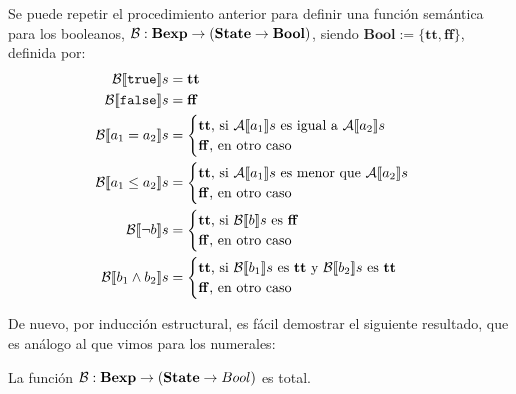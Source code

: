 Se puede repetir el procedimiento anterior para definir una función semántica para los booleanos, $\mathcal{B} : \mathbf{Bexp} \rightarrow (\mathbf{State}\rightarrow \mathbf{Bool})$, siendo $\mathbf{Bool} := \{\mathbf{tt}, \mathbf{ff}\}$, definida por:
\begin{align*}
    \fc{B}{\n{true}}s & = \mathbf{tt}\\
    \fc{B}{\n{false}}s & = \mathbf{ff} \\
    \fc{B}{a_1 = a_2}s & = \begin{cases} \mathbf{tt}\text{, si }\fc{A}{a_1}s\text{ es igual a } \fc{A}{a_2}s \\ \mathbf{ff}\text{, en otro caso}\end{cases}\\
    \fc{B}{a_1 \leq a_2}s & = \begin{cases} \mathbf{tt}\text{, si }\fc{A}{a_1}s\text{ es menor que } \fc{A}{a_2}s \\ \mathbf{ff}\text{, en otro caso}\end{cases}\\
    \fc{B}{\neg b}s & = \begin{cases} \mathbf{tt}\text{, si }\fc{B}{b}s\text{ es } \mathbf{ff} \\ \mathbf{ff} \text{, en otro caso}\end{cases}\\
    \fc{B}{b_1 \land b_2}s & = \begin{cases} \mathbf{tt}\text{, si }\fc{B}{b_1}s\text{ es } \mathbf{tt}\text{ y } \fc{B}{b_2}s\text{ es } \mathbf{tt} \\ \mathbf{ff}\text{, en otro caso}\end{cases}
\end{align*}

De nuevo, por inducción estructural, es fácil demostrar el siguiente resultado, que es análogo al que vimos para los numerales:
\begin{prop}
La función $\mathcal{B} : \mathbf{Bexp} \rightarrow (\mathbf{State}\rightarrow Bool)$ es total.
\end{prop}

